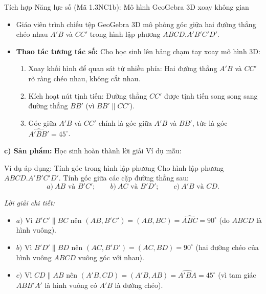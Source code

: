 \documentclass[12pt, a4paper]{article}
\begin{document}
\begin{aibox}{Tích hợp Năng lực số (Mã 1.3NC1b): Mô hình GeoGebra 3D xoay không gian}
\begin{itemize}[leftmargin=0.6cm]
    \item Giáo viên trình chiếu tệp GeoGebra 3D mô phỏng góc giữa hai đường thẳng chéo nhau $A'B$ và $CC'$ trong hình lập phương $ABCD.A'B'C'D'$.
    \item \textbf{Thao tác tương tác số:} Cho học sinh lên bảng chạm tay xoay mô hình 3D:
    \begin{enumerate}
        \item Xoay khối hình để quan sát từ nhiều phía: Hai đường thẳng $A'B$ và $CC'$ rõ ràng chéo nhau, không cắt nhau.
        \item Kích hoạt nút tịnh tiến: Đường thẳng $CC'$ được tịnh tiến song song sang đường thẳng $BB'$ (vì $BB' \parallel CC'$).
        \item Góc giữa $A'B$ và $CC'$ chính là góc giữa $A'B$ và $BB'$, tức là góc $\widehat{A'BB'} = 45^\circ$.
    \end{enumerate}
\end{itemize}
\end{aibox}

\noindent \textbf{c) Sản phẩm:}
Học sinh hoàn thành lời giải Ví dụ mẫu:
\begin{pedabox}{Ví dụ áp dụng: Tính góc trong hình lập phương}
Cho hình lập phương $ABCD.A'B'C'D'$. Tính góc giữa các cặp đường thẳng sau:
$$a) \ AB\text{ và }B'C'; \qquad b) \ AC\text{ và }B'D'; \qquad c) \ A'B\text{ và }CD.$$
\end{pedabox}
\textit{Lời giải chi tiết:}
\begin{itemize}
    \item $a)$ Vì $B'C' \parallel BC$ nên $(AB, B'C') = (AB, BC) = \widehat{ABC} = 90^\circ$ (do $ABCD$ là hình vuông).
    \item $b)$ Vì $B'D' \parallel BD$ nên $(AC, B'D') = (AC, BD) = 90^\circ$ (hai đường chéo của hình vuông $ABCD$ vuông góc với nhau).
    \item $c)$ Vì $CD \parallel AB$ nên $(A'B, CD) = (A'B, AB) = \widehat{A'BA} = 45^\circ$ (vì tam giác $ABB'A'$ là hình vuông có $A'B$ là đường chéo).
\end{itemize}
\end{document}
